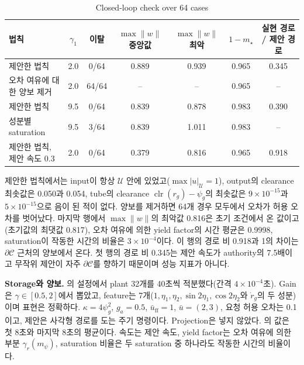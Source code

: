 \documentclass[11pt]{article}\usepackage[margin=1in]{geometry}\usepackage{amsmath,amssymb,amsthm,mathtools}\usepackage{graphicx}\graphicspath{{figures/}{../figures/}{figs/}{./}}\usepackage{enumitem}\usepackage{hyperref}\usepackage{cleveref}\usepackage{tikz}\usetikzlibrary{arrows.meta,positioning,calc,shapes.geometric}\usepackage{float}\usepackage[most]{tcolorbox}\usepackage{kotex}\usepackage{booktabs}\emergencystretch=1.6em\tolerance=2000 \crefname{assumption}{Assumption}{Assumptions}\Crefname{assumption}{Assumption}{Assumptions}\crefname{definition}{Definition}{Definitions}\Crefname{definition}{Definition}{Definitions}\crefname{proposition}{Proposition}{Propositions}\Crefname{proposition}{Proposition}{Propositions}\crefname{fact}{Fact}{Facts}\Crefname{fact}{Fact}{Facts} \newtheorem{assumption}{Assumption}\newtheorem{definition}{Definition}\newtheorem{lemma}{Lemma}\newtheorem{proposition}{Proposition}\newtheorem{theorem}{Theorem}\newtheorem{corollary}{Corollary}\newtheorem{fact}{Fact}\theoremstyle{remark}\newtheorem{remark}{Remark} \newcommand{\R}{\mathbb{R}}\newcommand{\U}{\mathcal U}
\newcommand{\Cset}{\mathcal C}\newcommand{\Pcl}{\mathcal P}\newcommand{\Zset}{\mathcal Z_0}\newcommand{\Xset}{\mathcal X_0}
\DeclareMathOperator{\clr}{clr}\newcommand{\norm}[1]{\lVert #1\rVert}\newcommand{\what}{\hat w}
\begin{document}
\begin{table}[H]
\centering\footnotesize\setlength{\tabcolsep}{4pt}
\caption{Closed-loop check over 64 cases}
\label{tab:loop}
\begin{tabular}{p{4.6cm}cccccc}
\toprule
법칙 & $\gamma_1$ & 이탈 & $\max\norm{w}$ 중앙값 & $\max\norm{w}$ 최악 & $1-m_\star$ & 실현 경로 / 제안 경로 \\
\midrule
제안한 법칙 & 2.0 & 0/64 & 0.889 & 0.939 & 0.965 & 0.345 \\
오차 여유에 대한 양보 제거 & 2.0 & 64/64 & -- & -- & 0.965 & -- \\
제안한 법칙 & 9.5 & 0/64 & 0.839 & 0.878 & 0.983 & 0.390 \\
성분별 saturation & 9.5 & 3/64 & 0.839 & 1.011 & 0.983 & -- \\
제안한 법칙, 제안 속도 0.3 & 2.0 & 0/64 & 0.379 & 0.816 & 0.965 & 0.918 \\
\bottomrule
\end{tabular}
\end{table}

제안한 법칙에서는 input이 항상 $\U$ 안에 있었고($\max|u|_{\U}=1$), output의 clearance 최솟값은 0.050과 0.054, tube의 clearance $\clr(r_g)-\psi_g$의 최솟값은 $9\times10^{-15}$과 $5\times10^{-15}$으로 음이 된 적이 없다. 양보를 제거하면 64개 경우 모두에서 오차가 허용 오차를 벗어났다. 마지막 행에서 $\max\norm{w}$의 최악값 0.816은 초기 조건에서 온 값이고(초기값의 최댓값 0.817), 오차 여유에 의한 yield factor의 시간 평균은 0.9998, saturation이 작동한 시간의 비율은 $3\times10^{-4}$이다. 이 행의 경로 비 0.918과 1의 차이는 $\partial\Cset$ 근처의 양보에서 온다. 첫 행의 경로 비 0.345는 제안 속도가 authority의 7.5배이고 무작위 제안이 자주 $\partial\Cset$를 향하기 때문이며 성능 지표가 아니다.

\textbf{Storage와 양보.} 의 설정에서 plant 32개를 40초씩 적분했다(간격 $4\times10^{-4}$초). Gain은 $\gamma\in[0.5,2]$에서 뽑았고, feature는 7개($1,\eta_1,\eta_2,\sin2\eta_1,\cos2\eta_2$와 $\dot r_g$의 두 성분)이며 표현은 정확하다. $\kappa=4\psi_g^2$, $g_a=0.5$, $\bar u_{\mathrm{ff}}=1$, $\bar u=(2,3)$, 요청 허용 오차는 0.1이고, 제안은 사각형 경로를 도는 주기 명령이다. Projection은 넣지 않았다. 의 값은 첫 8초와 마지막 8초의 평균이다. 속도는 제안 속도, yield factor는 오차 여유에 의한 부분 $\gamma_r(m_\psi)$, saturation 비율은 두 saturation 중 하나라도 작동한 시간의 비율이다.
\end{document}
